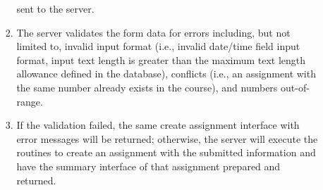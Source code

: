 \begin{enumerate}
\begin{itemize}
\begin{enumerate}
                sent to the server.
            \item The server validates the form data for errors including,
                but not limited to,
                invalid input format
                (i.e., invalid date/time field input format,
                input text length is greater than the maximum text length
                allowance defined in the database),
                conflicts (i.e., an assignment with the same
                number already exists in the course),
                and numbers out-of-range.
            \item If the validation failed, the same create assignment interface
                with error messages will be returned; otherwise, the server will
                execute the routines to create an assignment with the submitted
                information and have the summary interface of that assignment
                prepared and returned.
        \end{enumerate}
\end{itemize}


\end{enumerate}

